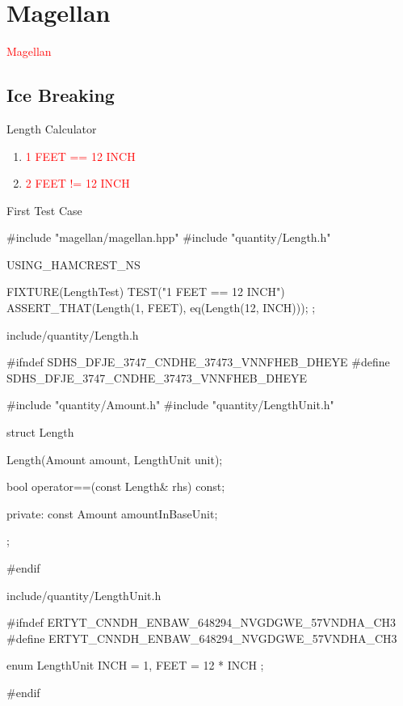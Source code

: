 \section{Magellan}
\label{sec:magellan}

\begin{frame}
  \begin{center}
    \Huge{\textcolor{red}{Magellan}}
  \end{center}
\end{frame}

\subsection{Ice Breaking}

\begin{frame}{Length Calculator}
  \begin{enumerate}
    \item \textcolor{red}{1 FEET == 12 INCH}
    \item \textcolor{red}{2 FEET != 12 INCH}
  \end{enumerate}
\end{frame}

\begin{frame}[fragile]{First Test Case}
\begin{c++}
#include "magellan/magellan.hpp"
#include "quantity/Length.h"

USING_HAMCREST_NS

FIXTURE(LengthTest)
{
    TEST("1 FEET == 12 INCH")
    {
        ASSERT_THAT(Length(1, FEET), eq(Length(12, INCH)));
    }
};
\end{c++}
\end{frame}

\begin{frame}[fragile]{include/quantity/Length.h}
\begin{c++}
#ifndef SDHS_DFJE_3747_CNDHE_37473_VNNFHEB_DHEYE
#define SDHS_DFJE_3747_CNDHE_37473_VNNFHEB_DHEYE

#include "quantity/Amount.h"
#include "quantity/LengthUnit.h"

struct Length
{
    Length(Amount amount, LengthUnit unit);

    bool operator==(const Length& rhs) const;

private:
    const Amount amountInBaseUnit;
};

#endif
\end{c++}
\end{frame}

\begin{frame}[fragile]{include/quantity/LengthUnit.h}
\begin{c++}
#ifndef ERTYT_CNNDH_ENBAW_648294_NVGDGWE_57VNDHA_CH3
#define ERTYT_CNNDH_ENBAW_648294_NVGDGWE_57VNDHA_CH3

enum LengthUnit 
{ 
    INCH = 1, 
    FEET = 12 * INCH 
};

#endif
\end{c++}
\end{frame}

